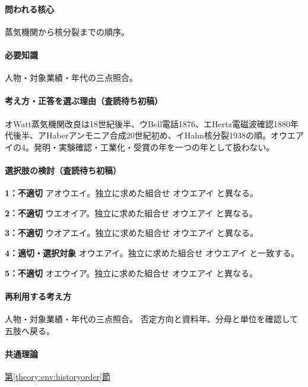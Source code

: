 \paragraph{問われる核心} 蒸気機関から核分裂までの順序。

\paragraph{必要知識} 人物・対象業績・年代の三点照合。

\paragraph{考え方・正答を選ぶ理由（査読待ち初稿）} オWatt蒸気機関改良は18世紀後半、ウBell電話1876、エHertz電磁波確認1880年代後半、アHaberアンモニア合成20世紀初め、イHahn核分裂1938の順。オウエアイの4。発明・実験確認・工業化・受賞の年を一つの年として扱わない。

\paragraph{選択肢の検討（査読待ち初稿）}\mbox{}\par

\noindent\textbf{1：不適切} アオウエイ。独立に求めた組合せ オウエアイ と異なる。\par

\noindent\textbf{2：不適切} ウエオイア。独立に求めた組合せ オウエアイ と異なる。\par

\noindent\textbf{3：不適切} ウオアエイ。独立に求めた組合せ オウエアイ と異なる。\par

\noindent\textbf{4：適切・選択対象} オウエアイ。独立に求めた組合せ オウエアイ と一致する。\par

\noindent\textbf{5：不適切} オエウイア。独立に求めた組合せ オウエアイ と異なる。\par

\paragraph{再利用する考え方} 人物・対象業績・年代の三点照合。 否定方向と資料年、分母と単位を確認して五肢へ戻る。

\paragraph{共通理論} \hyperref[theory:env:historyorder]{第\ref*{theory:env:historyorder}節}

